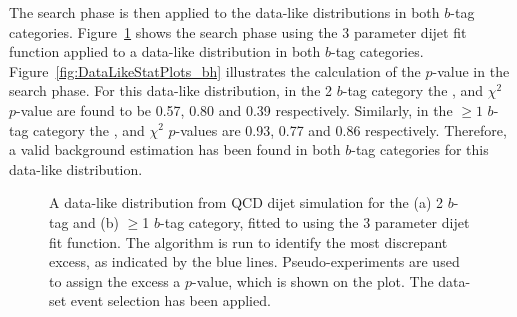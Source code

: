 The search phase is then applied to the data-like distributions
in both $b$-tag categories.
Figure~\ref{fig:DataLikeSearchPhase} shows the search phase 
using the 3 parameter dijet fit function
applied to a  data-like distribution in both $b$-tag categories.
Figure~\ref{fig:DataLikeStatPlots_bh} illustrates the calculation of the \bh{} $p$-value in the search phase.
For this data-like distribution, in the 2 $b$-tag category
the \bh{}, \dhunt{} and  $\chi^{2}$ \mbox{$p$-value} are found to be
0.57, 0.80 and 0.39 respectively.
Similarly, in the $\geq1$ $b$-tag category the
\bh{}, \dhunt{} and  $\chi^{2}$ \mbox{$p$-value}s are
0.93, 0.77 and 0.86 respectively.
Therefore, a valid background estimation has been found in both $b$-tag categories for this data-like distribution.

\begin{figure}[!ht]
  \begin{center}
   \captionsetup[subfigure]{aboveskip=0pt,justification=centering}
  \end{center}
  \vspace{-1em}
  \caption[A data-like distribution from QCD dijet simulation for the 2 and $\geq$1 $b$-tag
            category, fitted to using the 3 parameter dijet fit function.]
          {A data-like distribution from QCD dijet simulation for the (a) 2 $b$-tag and (b) $\geq$1 $b$-tag
            category, fitted to using the 3 parameter dijet fit function.
            The \bh{} algorithm is run to identify the most discrepant excess, as indicated by the blue lines.
            Pseudo-experiments are used to assign the excess a \mbox{$p$-value}, which is shown on the plot.
            The \summer{} data-set event selection has been applied.}
  \label{fig:DataLikeSearchPhase}
\end{figure}

